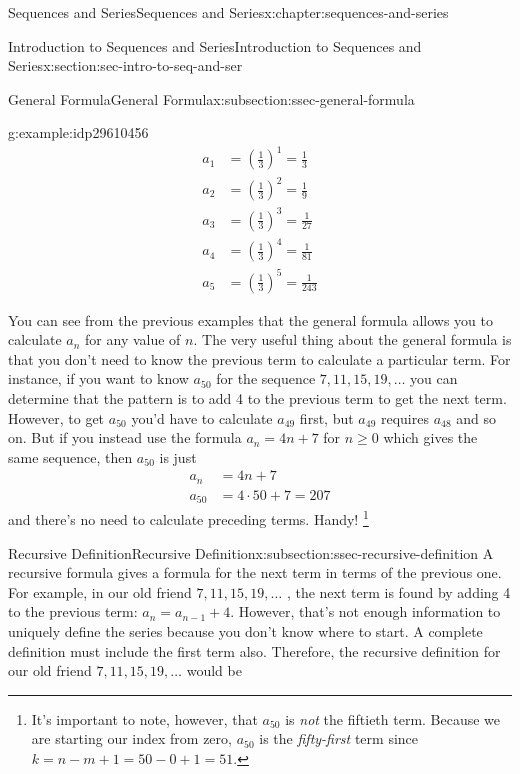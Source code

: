 \documentclass[twoside,10pt,]{book}
\numberwithin{equation}{section}
\newcommand{\amp}{&}
\begin{document}
\begin{chapterptx}{Sequences and Series}{}{Sequences and Series}{}{}{x:chapter:sequences-and-series}
\begin{sectionptx}{Introduction to Sequences and Series}{}{Introduction to Sequences and Series}{}{}{x:section:sec-intro-to-seq-and-ser}
\begin{subsectionptx}{General Formula}{}{General Formula}{}{}{x:subsection:ssec-general-formula}
\begin{example}{}{g:example:idp29610456}
\begin{align*}
{a_1} \amp = {\left( {\frac{1}{3}} \right)^1} = \frac{1}{3}\\
{a_2} \amp = {\left( {\frac{1}{3}} \right)^2} = \frac{1}{9}\\
{a_3} \amp = {\left( {\frac{1}{3}} \right)^3} = \frac{1}{{27}}\\
{a_4} \amp = {\left( {\frac{1}{3}} \right)^4} = \frac{1}{{81}}\\
{a_5} \amp = {\left( {\frac{1}{3}} \right)^5} = \frac{1}{{243}}
\end{align*}
\end{example}
%
\par
You can see from the previous examples that the general formula allows you to calculate \(a_n\) for any value of \(n\). The very useful thing about the general formula is that you don't need to know the previous term to calculate a particular term.  For instance, if you want to know \(a_{50}\) for the sequence  \(7, 11, 15, 19, \ldots\)  you can determine that the pattern is to add 4 to the previous term to get the next term.  However, to get \(a_{50}\)  you'd have to calculate \(a_{49}\) first, but \(a_{49}\) requires \(a_{48}\)  and so on.  But if you instead use the formula \({a_n} = 4n + 7\) for \(n \ge 0\)  which gives the same sequence, then \(a_{50}\) is just%
\begin{align*}
{a_n} \amp = 4n + 7\\
{a_{50}} \amp = 4 \cdot 50 + 7 = 207
\end{align*}
and there's no need to calculate preceding terms.  Handy!  \footnote{It's important to note, however, that \(a_{50}\) is \emph{not} the fiftieth term.  Because we are starting our index from zero, \(a_{50}\) is the \emph{fifty-first} term since \(k = n - m + 1 = 50 - 0 + 1 = 51\).\label{g:fn:idp29618136}}%
\end{subsectionptx}
%
%
\typeout{************************************************}
\typeout{************************************************}
%
\begin{subsectionptx}{Recursive Definition}{}{Recursive Definition}{}{}{x:subsection:ssec-recursive-definition}
A recursive formula gives a formula for the next term in terms of the previous one.  For example, in our old friend \(7, 11, 15, 19, \ldots\) , the next term is found by adding 4 to the previous term:  \({a_n} = {a_{n - 1}} + 4\).  However, that's not enough information to uniquely define the series because you don't know where to start.  A complete definition must include the first term also.  Therefore, the recursive definition for our old friend \(7, 11, 15, 19, \ldots\) would be%

\end{subsectionptx}
\end{sectionptx}
\end{chapterptx}
\end{document}
